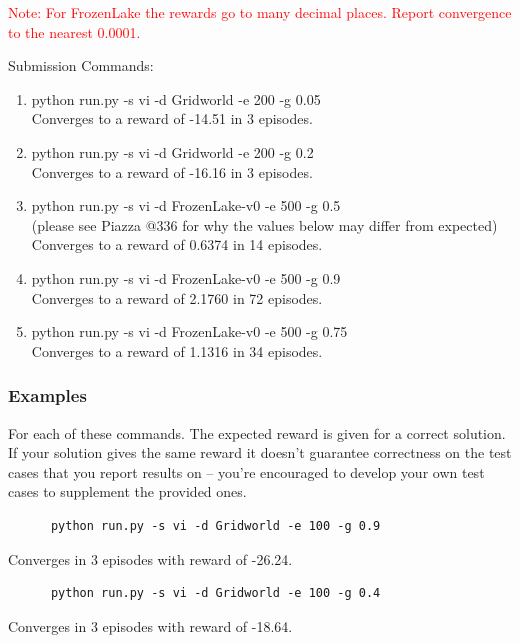 \documentclass[a4paper]{article}
\theoremstyle{definition}
\newcommand{\red}[1]{\textcolor{red}{#1}}
\begin{document}
\red{Note: For FrozenLake the rewards go to many decimal places. Report convergence to the nearest 0.0001.}

\vspace{8mm}

Submission Commands:
\begin{enumerate} 
    \item   python run.py -s vi -d Gridworld -e 200 -g 0.05
            \\Converges to a reward of -14.51 in 3 episodes.
            
    \item   python run.py -s vi -d Gridworld -e 200 -g 0.2
            \\Converges to a reward of -16.16 in 3 episodes.
            
    \item  python run.py -s vi -d FrozenLake-v0 -e 500 -g 0.5
            \\(please see Piazza @336 for why the values below may differ from expected)
            \\Converges to a reward of 0.6374 in 14 episodes.
            
    \item  python run.py -s vi -d FrozenLake-v0 -e 500 -g 0.9 
            \\Converges to a reward of 2.1760 in 72 episodes. 
            
    \item python run.py -s vi -d FrozenLake-v0 -e 500 -g 0.75
            \\Converges to a reward of 1.1316 in 34 episodes.
\end{enumerate}
    

\subsubsection*{Examples}

For each of these commands. The expected reward is given for a correct solution. 
If your solution gives the same reward it doesn't guarantee correctness on the test cases that you report results on -- you're encouraged to develop your own test cases to supplement the provided ones.

\begin{verbatim}
      python run.py -s vi -d Gridworld -e 100 -g 0.9  
\end{verbatim}
Converges in 3 episodes with reward of -26.24.

\begin{verbatim}
      python run.py -s vi -d Gridworld -e 100 -g 0.4  
\end{verbatim}
Converges in 3 episodes with reward of -18.64.
\end{document}
